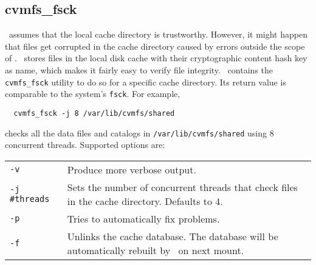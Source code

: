 \subsection{cvmfs\_fsck}
\cvmfs\ assumes that the local cache directory is trustworthy.
However, it might happen that files get corrupted in the cache directory caused by errors outside the scope of \cvmfs.
\cvmfs\ stores files in the local disk cache with their cryptographic content hash key as name, which makes it fairly easy to verify file integrity.
\cvmfs\ contains the \texttt{cvmfs\_fsck} utility to do so for a specific cache directory. 
Its return value is comparable to the system's \texttt{fsck}.
For example,
\begin{verbatim}
  cvmfs_fsck -j 8 /var/lib/cvmfs/shared
\end{verbatim}
checks all the data files and catalogs in \texttt{/var/lib/cvmfs/shared} using 8 concurrent threads.  
Supported options are:

\begin{tabularx}{\linewidth}{lX}
	\texttt{-v}				& Produce more verbose output.\\
	\texttt{-j \#threads}	& Sets the number of concurrent threads that check files in the cache directory. Defaults to 4. \\
	\texttt{-p} 			& Tries to automatically fix problems. \\
	\texttt{-f} 			& Unlinks the cache database.  The database will be automatically rebuilt by \cvmfs\ on next mount.\\
\end{tabularx}

